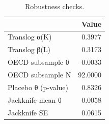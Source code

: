 \begin{table}[t]
\centering\small
\begin{tabular}{lr}
\toprule
 & Value \\
\midrule
Translog α(K) & 0.3977 \\
Translog β(L) & 0.3173 \\
OECD subsample θ & -0.0033 \\
OECD subsample N & 92.0000 \\
Placebo θ (p-value) & 0.8326 \\
Jackknife mean θ & 0.0058 \\
Jackknife SE & 0.0615 \\
\bottomrule
\end{tabular}
\caption{Robustness checks.}
\label{tab:robust}
\end{table}